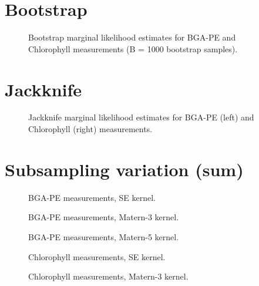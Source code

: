 \documentclass{article}
\newlength\figureheight
\newlength\figurewidth
\begin{document}
\section{Bootstrap}
\setlength\figureheight{2in}
\setlength{}
\begin{figure}[h]
\centering

\caption{Bootstrap marginal likelihood estimates for BGA-PE and Chlorophyll measurements (B = 1000 bootstrap samples).}
\end{figure}

\vspace{0.5in}

\section{Jackknife}
\setlength\figureheight{2.7in}
\setlength{}
\begin{figure}[!h]
\centering

\hfill

\caption{Jackknife marginal likelihood estimates for BGA-PE (left) and Chlorophyll (right) measurements.}
\end{figure}

\section{Subsampling variation (sum)}
\setlength\figureheight{1.8in}
\setlength{}
\begin{figure}[!h]
\centering

\caption{BGA-PE measurements, SE kernel.}
\end{figure}

\begin{figure}[!h]
\centering

\caption{BGA-PE measurements, Matern-3 kernel.}
\end{figure}

\begin{figure}[!h]
\centering

\caption{BGA-PE measurements, Matern-5 kernel.}
\end{figure}

\begin{figure}[!h]
\centering

\caption{Chlorophyll measurements, SE kernel.}
\end{figure}

\begin{figure}[!h]
\centering

\caption{Chlorophyll measurements, Matern-3 kernel.}
\end{figure}
\end{document}
